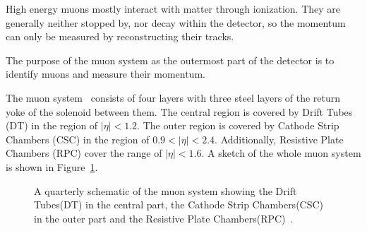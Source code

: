 High energy muons mostly interact with matter through ionization.
They are generally neither stopped by, nor decay within the detector, so the momentum can only be measured by reconstructing their tracks.

The purpose of the muon system as the outermost part of the detector is to identify muons and measure their momentum.

The muon system~\cite{Bayatian:922757} consists of four layers with three steel layers of the return yoke of the solenoid between them.
The central region is covered by Drift Tubes (DT) in the region of $|\eta|< 1.2$. The outer region is covered by Cathode Strip Chambers (CSC) in the region of $0.9<|\eta|<2.4$.
Additionally, Resistive Plate Chambers (RPC) cover the range of $|\eta|<1.6$.
A sketch of the whole muon system is shown in Figure~\ref{fig:det_muon}.

\begin{figure}[htbp!]
  \begin{center}

\caption{A quarterly schematic of the muon system showing the Drift Tubes(DT) in the central part, the Cathode Strip Chambers(CSC) in the outer part and the Resistive Plate Chambers(RPC)~\cite{Bayatian:922757}.
  \label{fig:det_muon}}
  \end{center}
\end{figure}

